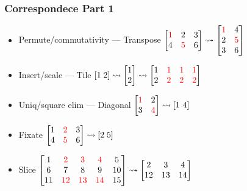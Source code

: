 \documentclass[xetex,mathserif,serif]{beamer}
\newcommand\NB[1]{\textcolor{red}{#1}}
\begin{document}
\begin{frame}
  \frametitle{Correspondece Part 1}
  \begin{itemize}%
    \item Permute/commutativity --- Transpose \(
      \begin{bmatrix}
        \NB 1 & 2 & 3 \\
        4 & \NB 5 & 6
      \end{bmatrix} \leadsto
      \begin{bmatrix}
        \NB 1 & 4 \\
        2 & \NB 5 \\
        3 & 6
      \end{bmatrix}
      \)
    \item Insert/scale --- Tile \(
      [1\;2]\leadsto
      \begin{bmatrix} 1 \\ 2 \end{bmatrix}\leadsto
      \begin{bmatrix} 1 & \NB 1 & \NB 1 & \NB  1 \\ 2 & \NB 2 & \NB 2 & \NB 2 \end{bmatrix}
    \)
    \item Uniq/square elim --- Diagonal \(
      \begin{bmatrix}
        \NB 1 & 2 \\
        3 & \NB 4
      \end{bmatrix} \leadsto [1\ 4]
      \)
    \item Fixate 
      \( \begin{bmatrix}
          1 & \NB 2 & 3 \\ 4 & \NB 5 & 6
        \end{bmatrix} \leadsto
        [2\;5] \)
    \item Slice
      \(
        \begin{bmatrix}
          1 & \NB 2 & \NB 3 & \NB 4 & 5 \\
          6 & 7 & 8 &  9 & 10 \\
          11 & \NB{12} & \NB{13} & \NB{14} & 15
        \end{bmatrix} \leadsto \begin{bmatrix}
          2 & 3 & 4 \\
          12 & 13 & 14
        \end{bmatrix}
      \)
  \end{itemize}
\end{frame}
\end{document}
